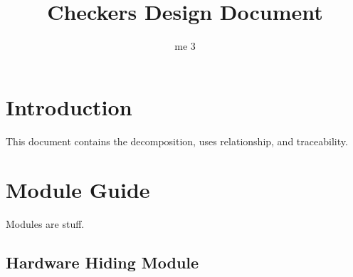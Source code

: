 \documentclass[10pt]{article}
\title{\bf Checkers Design Document}
\author{me 3}
\date{}
\begin{document}
\maketitle

\tableofcontents

\section{Introduction}
    This document contains the decomposition, uses relationship, and traceability.
    
\section{Module Guide}
Modules are stuff.

\subsection{Hardware Hiding Module}
\iffalse
    \begin{tikzpicture}[scale=1.5, align=center]
        \node[root] {Hardware Hiding Module}
        child {node[level 2, hyperlink node=mod:Board]{Wireless Communications}}
        child {node[level 2, hyperlink node=mod:Piece]{Clock}}
        child {node[level 2]{Positioning the nodes}}
        child {node[level 2]{Positioning the nodes}
            child[subA] {node[level 3]{Joe}}
            child[subB] {node[level 3]{Heather}}
            child[subC] {node[level 3]{Barbara}}}
        child {node[level 2]{Positioning the nodes}
            child[subA] {node[level 3]{Joe}}
            child[subB] {node[level 3]{Heather}}
            child[subC] {node[level 3]{Barbara}}}
        child {node[level 2]{Positioning the nodes}
            child[subA] {node[level 3]{Joe}}
            child[subB] {node[level 3]{Heather}}
            child[subC] {node[level 3]{Barbara}}}
        child {node[level 2]{Positioning the nodes}
            child[subA] {node[level 3]{Joe}}
            child[subB] {node[level 3]{Heather}}
            child[subC] {node[level 3]{Barbara}}}
        ;
    \end{tikzpicture}
\fi
    
\end{document}
